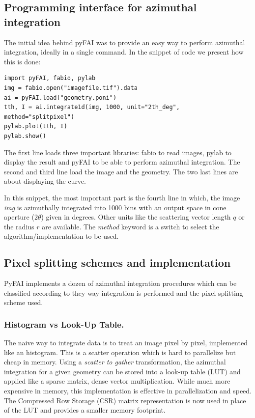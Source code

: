 \documentclass[preprint]{iucr}
\begin{document}
\subsection{Programming interface for azimuthal integration}

The initial idea behind pyFAI was to provide an easy way to perform azimuthal
integration, ideally in a single command. In the snippet of code we present how
this is done:

\begin{verbatim}
import pyFAI, fabio, pylab
img = fabio.open("imagefile.tif").data
ai = pyFAI.load("geometry.poni")
tth, I = ai.integrate1d(img, 1000, unit="2th_deg", method="splitpixel")
pylab.plot(tth, I)
pylab.show()
\end{verbatim}

The first line loads three important libraries: fabio \cite{fabio} to read
images, pylab \cite{matplotlib} to display the result and pyFAI to be able to
perform azimuthal integration.
The second and third line load the image and the geometry.
The two last lines are about displaying the curve.

In this snippet, the most important part is the fourth line in which, the image
\textit{img} is azimuthally integrated into 1000 bins with an output space in
cone aperture ($2\theta$) given in degrees. Other
units like the scattering vector length $q$ or the radius $r$ are available.
The \textit{method} keyword is a switch to select the algorithm/implementation
to be used.

\subsection{Pixel splitting schemes and implementation}

PyFAI implements a dozen of azimuthal integration procedures which can be
classified according to they way integration is performed and the pixel
splitting scheme used.

\subsubsection{Histogram vs Look-Up Table.}
The naive way to integrate data is to treat an image pixel by pixel,
implemented like an histogram. This is a scatter operation which is hard to
parallelize but cheap in memory.
Using a \textit{scatter to gather} transformation, the azimuthal integration for
a given geometry can be stored into a look-up table (LUT) and applied like a
sparse matrix, dense vector multiplication.
While much more expensive in memory, this
implementation is effective in parallelization and speed.
The Compressed Row Storage (CSR) matrix representation is now used in place of
the LUT and provides a smaller memory footprint.
\end{document}
